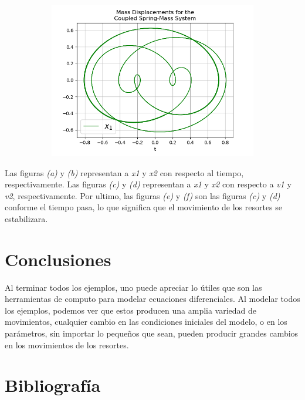 \documentclass{article}
\begin{document}
\begin{figure}[h!]
\begin{subfigure}[b]{0.45\linewidth}
    \caption{}
  \end{subfigure}
  \begin{subfigure}[b]{0.45\linewidth}
    \includegraphics[width=\linewidth]{two_springs416.png}
    \caption{}
  \end{subfigure}
\end{figure}

Las figuras \textit{(a)} y \textit{(b)} representan a \textit{x1} y \textit{x2} con respecto al tiempo, respectivamente. Las figuras \textit{(c)} y \textit{(d)} representan a \textit{x1} y \textit{x2} con respecto a \textit{v1} y \textit{v2}, respectivamente. Por ultimo, las figuras \textit{(e)} y \textit{(f)} son las figuras \textit{(c)} y \textit{(d)} conforme el tiempo pasa, lo que significa que el movimiento de los resortes se estabilizara.

\vspace{1.0cm}

\section{Conclusiones}

Al terminar todos los ejemplos, uno puede apreciar lo útiles que son las herramientas de computo para modelar ecuaciones diferenciales. Al modelar todos los ejemplos, podemos ver que estos producen una amplia variedad de movimientos, cualquier cambio en las condiciones iniciales del modelo, o en los parámetros, sin importar lo pequeños que sean, pueden producir grandes cambios en los movimientos de los resortes.

\section{Bibliografía}
\end{document}
